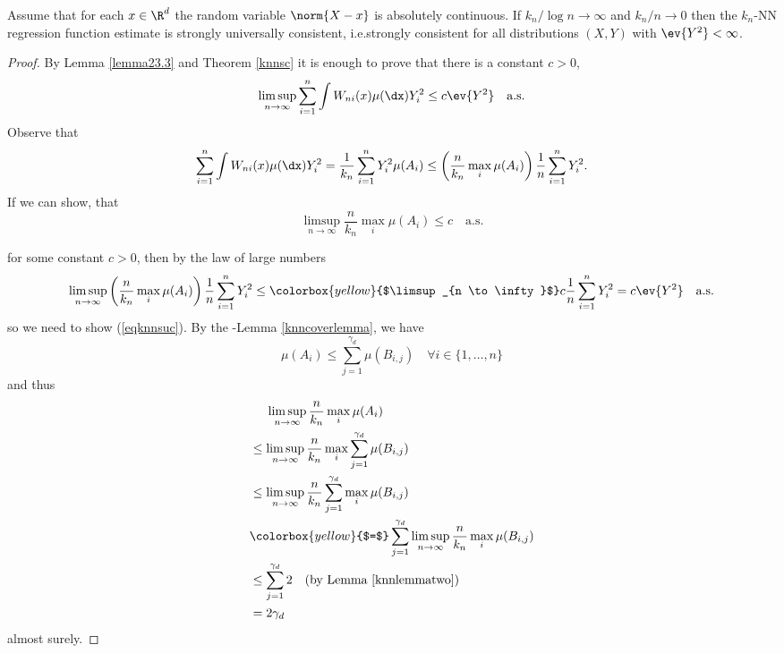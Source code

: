 \begin{theorem} \label{knnsuc}
Assume that for each \(x \in \R^d\) the random variable \(\norm{X - x}\) is absolutely continuous. If \(k_n / \log n \to \infty\) and \(k_n / n \to 0\) then the \(k_n\)-NN regression function estimate is strongly universally consistent, i.e.\@ strongly consistent for all distributions \((X, Y)\) with \(\ev{Y^2} < \infty\).
\end{theorem}

\begin{proof}
    By Lemma \ref{lemma23.3} and Theorem \ref{knnsc} it is enough to prove that there is a constant \(c > 0\),
    \[
        \limsup_{n \to \infty} \sum_{i = 1}^n \int W_{ni}(x) \mu(\dx) Y_i^2 \leq c \ev{Y^2} \quad \text{a.s.}
    \]
    Observe that
    \[
        \sum_{i = 1}^n \int W_{ni}(x) \mu(\dx) Y_i^2 = \frac{1}{k_n} \sum_{i=1}^n Y_i^2 \mu(A_i) \leq \left( \frac{n}{k_n} \max_i \mu(A_i) \right) \frac{1}{n} \sum_{i = 1}^n Y_i^2.
    \]
    If we can show, that
    \begin{equation} \label{eqknnsuc}
        \limsup_{n \to \infty} \frac{n}{k_n} \max_i \mu(A_i) \leq c \quad \text{a.s.}
    \end{equation}

    for some constant \(c > 0\), then by the law of large numbers
    \begin{align*}
        \limsup_{n \to \infty} \left( \frac{n}{k_n} \max_i \mu(A_i) \right) \frac{1}{n} \sum_{i = 1}^n Y_i^2 \leq \colorbox{yellow}{$\limsup_{n \to \infty}$} c \frac{1}{n} \sum_{i = 1}^n Y_i^2 = c \ev{Y^2} \quad \text{a.s.}
    \end{align*}
    so we need to show (\ref{eqknnsuc}). By the -Lemma \ref{knncoverlemma}, we have
    \[
        \mu(A_i) \leq \sum_{j=1}^{\gamma_d}\mu(B_{i,j}) \quad \forall i \in \{1, \ldots, n\} 
    \]
    and thus
    \begin{align*}
        &\quad \ \limsup_{n \to \infty} \frac{n}{k_n} \max_i \mu(A_i) \\
        &\leq \limsup_{n \to \infty} \frac{n}{k_n} \max_i \sum_{j=1}^{\gamma_d}\mu(B_{i,j}) \\
        &\leq \limsup_{n \to \infty} \frac{n}{k_n} \sum_{j=1}^{\gamma_d} \max_i \mu(B_{i,j}) \\ 
        &\colorbox{yellow}{$=$} \sum_{j=1}^{\gamma_d} \limsup_{n \to \infty} \frac{n}{k_n}  \max_i \mu(B_{i,j}) \\
        &\leq \sum_{j=1}^{\gamma_d} 2 \quad \text{(by Lemma \ref{knnlemmatwo})} \\
        &= 2 \gamma_d
    \end{align*}
    almost surely.
    
\end{proof}
\newpage

